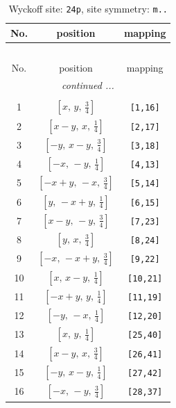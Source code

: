 \documentclass[fleqn,8pt]{jsarticle}
\begin{document}
\renewcommand{\arraystretch}{1.2}
\begin{longtable}{ccc}
\caption{Wyckoff site: {\tt 24p}, site symmetry: {\tt m..}}
 \\
 \hline \hline
No. & position & mapping \\ \hline \endfirsthead

\multicolumn{2}{l}{\tablename\ \thetable{}} \\
 \hline \hline
No. & position & mapping \\ \hline \endhead

 \hline \hline
\multicolumn{2}{r}{\footnotesize\it continued ...} \\ \endfoot

 \hline \hline
\multicolumn{2}{r}{} \\ \endlastfoot

1 & $\left[ x,\, y,\, \frac{3}{4} \right]$ & {\tt [1,16]} \\ \hline
2 & $\left[ x - y,\, x,\, \frac{1}{4} \right]$ & {\tt [2,17]} \\ \hline
3 & $\left[ - y,\, x - y,\, \frac{3}{4} \right]$ & {\tt [3,18]} \\ \hline
4 & $\left[ - x,\, - y,\, \frac{1}{4} \right]$ & {\tt [4,13]} \\ \hline
5 & $\left[ - x + y,\, - x,\, \frac{3}{4} \right]$ & {\tt [5,14]} \\ \hline
6 & $\left[ y,\, - x + y,\, \frac{1}{4} \right]$ & {\tt [6,15]} \\ \hline
7 & $\left[ x - y,\, - y,\, \frac{3}{4} \right]$ & {\tt [7,23]} \\ \hline
8 & $\left[ y,\, x,\, \frac{3}{4} \right]$ & {\tt [8,24]} \\ \hline
9 & $\left[ - x,\, - x + y,\, \frac{3}{4} \right]$ & {\tt [9,22]} \\ \hline
10 & $\left[ x,\, x - y,\, \frac{1}{4} \right]$ & {\tt [10,21]} \\ \hline
11 & $\left[ - x + y,\, y,\, \frac{1}{4} \right]$ & {\tt [11,19]} \\ \hline
12 & $\left[ - y,\, - x,\, \frac{1}{4} \right]$ & {\tt [12,20]} \\ \hline
13 & $\left[ x,\, y,\, \frac{1}{4} \right]$ & {\tt [25,40]} \\ \hline
14 & $\left[ x - y,\, x,\, \frac{3}{4} \right]$ & {\tt [26,41]} \\ \hline
15 & $\left[ - y,\, x - y,\, \frac{1}{4} \right]$ & {\tt [27,42]} \\ \hline
16 & $\left[ - x,\, - y,\, \frac{3}{4} \right]$ & {\tt [28,37]} \\ \hline

\end{longtable}
\end{document}
